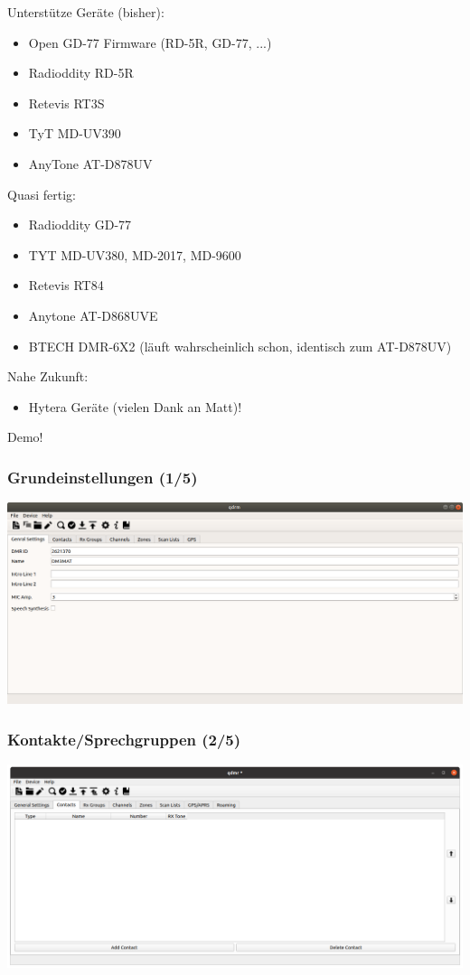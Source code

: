 \documentclass[aspectratio=169]{beamer}
\begin{document}
\begin{frame}
 Unterstütze Geräte (bisher):
 \begin{itemize}
  \item Open GD-77 Firmware (RD-5R, GD-77, ...)
  \item Radioddity RD-5R
  \item Retevis RT3S
  \item TyT MD-UV390
  \item AnyTone AT-D878UV
 \end{itemize}
 \pause Quasi fertig:
 \begin{itemize}
  \item Radioddity GD-77
  \item TYT MD-UV380, MD-2017, MD-9600
  \item Retevis RT84
  \item Anytone AT-D868UVE
  \item BTECH DMR-6X2 (läuft wahrscheinlich schon, identisch zum AT-D878UV)
 \end{itemize}  
 \pause Nahe Zukunft:
 \begin{itemize}
  \item Hytera Geräte (vielen Dank an Matt)!
 \end{itemize}
\end{frame}

\begin{frame}
 \begin{center}
  {\Huge Demo!}
 \end{center}
\end{frame}

\begin{frame} \frametitle{Grundeinstellungen (1/5)}
\begin{center}
 \includegraphics[width=0.75\linewidth]{../fig/qdmr-general-settings.png}
\end{center}
\end{frame}

\begin{frame} \frametitle{Kontakte/Sprechgruppen (2/5)}
\begin{center}
 \includegraphics[width=0.75\linewidth]{../fig/qdmr-contacts-empty.png}
\end{center}
\end{frame}
\end{document}
